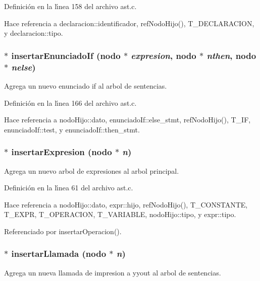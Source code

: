 Definici\'{o}n en la l\'{\i}nea 158 del archivo ast.c.

Hace referencia a declaracion::identificador, ref\-Nodo\-Hijo(), T\_\-DECLARACION, y declaracion::tipo.
\subsubsection{$\ast$ insertar\-Enunciado\-If ({\bf nodo} $\ast$ {\em expresion}, {\bf nodo} $\ast$ {\em nthen}, {\bf nodo} $\ast$ {\em nelse})}\label{ast_8c_a11}


Agrega un nuevo enunciado if al arbol de sentencias. 



Definici\'{o}n en la l\'{\i}nea 166 del archivo ast.c.

Hace referencia a nodo\-Hijo::dato, enunciado\-If::else\_\-stmt, ref\-Nodo\-Hijo(), T\_\-IF, enunciado\-If::test, y enunciado\-If::then\_\-stmt.
\subsubsection{$\ast$ insertar\-Expresion ({\bf nodo} $\ast$ {\em n})}\label{ast_8c_a6}


Agrega un nuevo arbol de expresiones al arbol principal. 



Definici\'{o}n en la l\'{\i}nea 61 del archivo ast.c.

Hace referencia a nodo\-Hijo::dato, expr::hijo, ref\-Nodo\-Hijo(), T\_\-CONSTANTE, T\_\-EXPR, T\_\-OPERACION, T\_\-VARIABLE, nodo\-Hijo::tipo, y expr::tipo.

Referenciado por insertar\-Operacion().
\subsubsection{$\ast$ insertar\-Llamada ({\bf nodo} $\ast$ {\em n})}\label{ast_8c_a16}


Agrega un nueva llamada de impresion a yyout al arbol de sentencias. 




